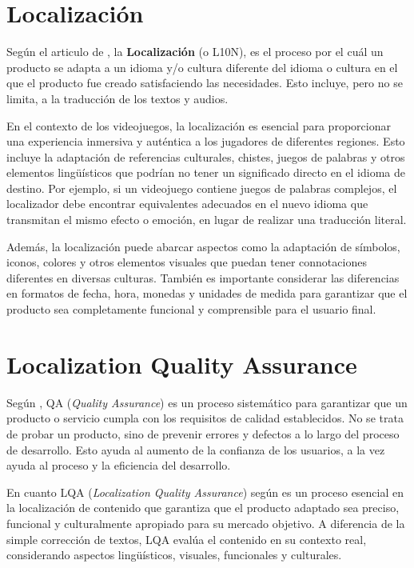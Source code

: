 \section{Localización}
\label{sec:Localization}

Según el articulo de \cite{Localization}, la \textbf{Localización} (o L10N), es el proceso por el cuál un producto se adapta a un idioma y/o cultura diferente del idioma o cultura en el que el producto fue creado satisfaciendo las necesidades. Esto incluye, pero no se limita, a la traducción de los textos y audios. 

En el contexto de los videojuegos, la localización es esencial para proporcionar una experiencia inmersiva y auténtica a los jugadores de diferentes regiones. Esto incluye la adaptación de referencias culturales, chistes, juegos de palabras y otros elementos lingüísticos que podrían no tener un significado directo en el idioma de destino. Por ejemplo, si un videojuego contiene juegos de palabras complejos, el localizador debe encontrar equivalentes adecuados en el nuevo idioma que transmitan el mismo efecto o emoción, en lugar de realizar una traducción literal.

Además, la localización puede abarcar aspectos como la adaptación de símbolos, iconos, colores y otros elementos visuales que puedan tener connotaciones diferentes en diversas culturas. También es importante considerar las diferencias en formatos de fecha, hora, monedas y unidades de medida para garantizar que el producto sea completamente funcional y comprensible para el usuario final. 

\section{Localization Quality Assurance}
\label{sec:LQA}

Según \cite{QA}, QA (\textit{Quality Assurance}) es un proceso sistemático para garantizar que un producto o servicio cumpla con los requisitos de calidad establecidos.
No se trata de probar un producto, sino de prevenir errores y defectos a lo largo del proceso de desarrollo.
Esto ayuda al aumento de la confianza de los usuarios, a la vez ayuda al proceso y la eficiencia del desarrollo.

En cuanto LQA (\textit{Localization Quality Assurance}) según \cite{LQA} es un proceso esencial en la localización de contenido que garantiza que el producto adaptado sea preciso, funcional y culturalmente apropiado para su mercado objetivo. A diferencia de la simple corrección de textos, LQA evalúa el contenido en su contexto real, considerando aspectos lingüísticos, visuales, funcionales y culturales.


